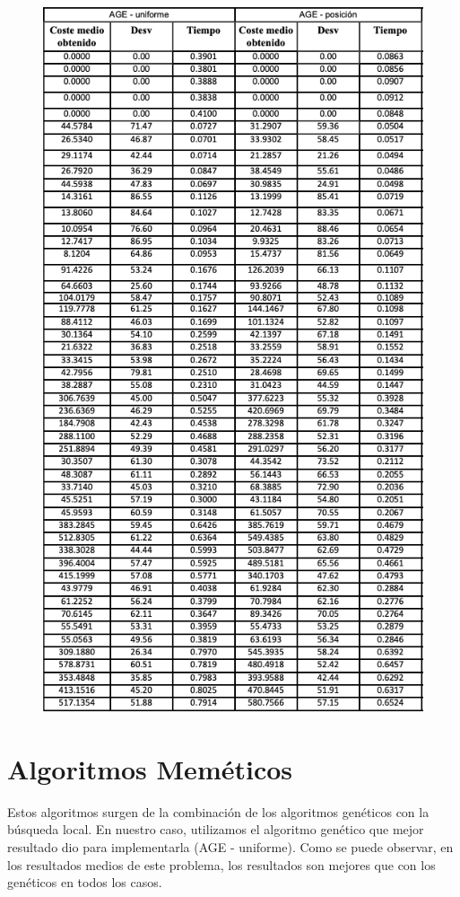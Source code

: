 \begin{figure}[H] %
    \centering
        \includegraphics[scale=0.7]{img/age.png}
\end{figure}


\section{Algoritmos Meméticos}
Estos algoritmos surgen de la combinación de los algoritmos genéticos con la búsqueda local. En nuestro caso, utilizamos el algoritmo genético que mejor resultado dio para implementarla (AGE - uniforme). Como se puede observar, en los resultados medios de este problema, los resultados son mejores que con los genéticos en todos los casos.

